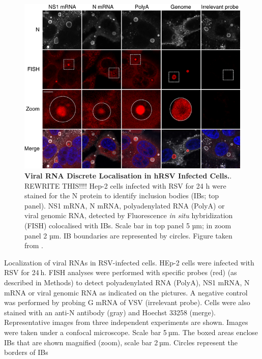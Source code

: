 \begin{figure}
    \centering
    \includegraphics[width=1\linewidth]{04. Introduction/Figs/11. RSV IBs.png}  
    \caption[Viral RNA Discrete Localisation in hRSV Infected Cells.]{\textbf{Viral RNA Discrete Localisation in hRSV Infected Cells.}. REWRITE THIS!!!! Hep-2 cells infected with RSV for 24 h were stained for the N protein to identify inclusion bodies (IBs; top panel). NS1 mRNA, N mRNA, polyadenylated RNA (PolyA) or viral genomic RNA, detected by Fluorescence \textit{in situ} hybridization (FISH) colocalised with IBs. Scale bar in top panel 5 µm; in zoom panel 2 µm. IB boundaries are represented by circles. Figure taken from \cite{Rincheval2017FunctionalVirus}.}
    \label{fig:Viral RNA Discrete Localisation in hRSV Infected Cells}
\end{figure}

Localization of viral RNAs in RSV-infected cells. HEp-2 cells were infected with RSV for 24 h. FISH analyses were performed with specific probes (red) (as described in Methods) to detect polyadenylated RNA (PolyA), NS1 mRNA, N mRNA or viral genomic RNA as indicated on the pictures. A negative control was performed by probing G mRNA of VSV (irrelevant probe). Cells were also stained with an anti-N antibody (gray) and Hoechst 33258 (merge). Representative images from three independent experiments are shown. Images were taken under a confocal microscope. Scale bar 5 µm. The boxed areas enclose IBs that are shown magnified (zoom), scale bar 2 µm. Circles represent the borders of IBs

